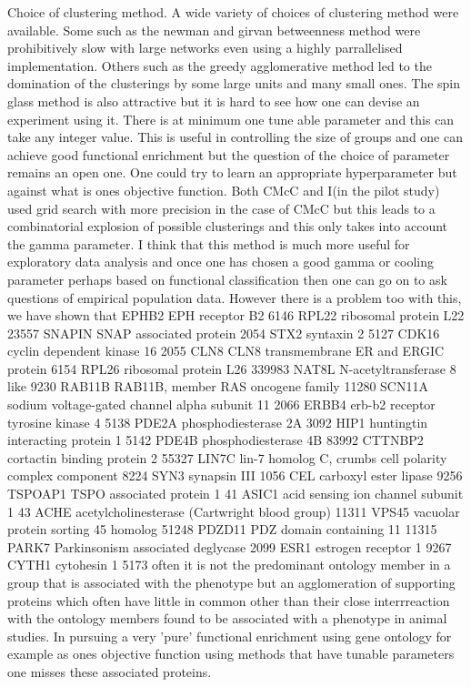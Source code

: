 Choice of clustering method. A wide variety of choices of clustering method were available. Some such as the newman and girvan betweenness method were prohibitively slow with large networks even using a highly parrallelised implementation. Others such as the greedy agglomerative method led to the domination of the clusterings by some large units and many small ones. The spin glass method is also attractive but it is hard to see how one can devise an experiment using it. There is at minimum one tune able parameter and this can take any integer value. This is useful in controlling the size of groups and one can achieve good functional enrichment but the question of the choice of parameter remains an open one. One could try to learn an appropriate hyperparameter but against what is ones objective function. Both CMcC and I(in the pilot study) used grid search with more precision in the case of CMcC but this leads to a combinatorial explosion of possible clusterings and this only takes into account the gamma parameter. I think that this method is much more useful for exploratory data analysis and once one has chosen a good gamma or cooling parameter perhaps based on functional classification then one can go on to ask questions of empirical population data. However there is a problem too with this, we have shown that	EPHB2	EPH receptor B2
6146	RPL22	ribosomal protein L22
23557	SNAPIN	SNAP associated protein
2054	STX2	syntaxin 2
5127	CDK16	cyclin dependent kinase 16
2055	CLN8	CLN8 transmembrane ER and ERGIC protein
6154	RPL26	ribosomal protein L26
339983	NAT8L	N-acetyltransferase 8 like
9230	RAB11B	RAB11B, member RAS oncogene family
11280	SCN11A	sodium voltage-gated channel alpha subunit 11
2066	ERBB4	erb-b2 receptor tyrosine kinase 4
5138	PDE2A	phosphodiesterase 2A
3092	HIP1	huntingtin interacting protein 1
5142	PDE4B	phosphodiesterase 4B
83992	CTTNBP2	cortactin binding protein 2
55327	LIN7C	lin-7 homolog C, crumbs cell polarity complex component
8224	SYN3	synapsin III
1056	CEL	carboxyl ester lipase
9256	TSPOAP1	TSPO associated protein 1
41	ASIC1	acid sensing ion channel subunit 1
43	ACHE	acetylcholinesterase (Cartwright blood group)
11311	VPS45	vacuolar protein sorting 45 homolog
51248	PDZD11	PDZ domain containing 11
11315	PARK7	Parkinsonism associated deglycase
2099	ESR1	estrogen receptor 1
9267	CYTH1	cytohesin 1
5173 often it is not the predominant ontology member in a group that is associated with the phenotype but an agglomeration of supporting proteins which often have little in common other than their close interrreaction with the ontology members found to be associated with a phenotype in animal studies. In pursuing a very 'pure' functional enrichment using gene ontology for example as ones objective function using methods that have tunable parameters one misses these associated proteins. 


